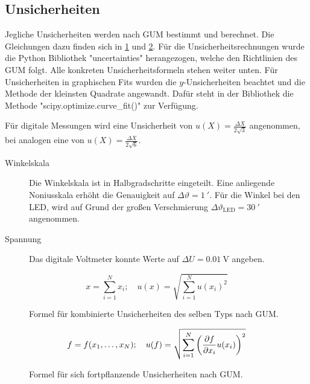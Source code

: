 \subsection{Unsicherheiten}\label{VGuD}

Jegliche Unsicherheiten werden nach GUM bestimmt und berechnet.
Die Gleichungen dazu finden sich in \ref{fig:GUM_combine} und \ref{fig:GUM_formula}.
Für die Unsicherheitsrechnungen wurde die Python Bibliothek "uncertainties" herangezogen, welche den Richtlinien des GUM folgt.
Alle konkreten Unsicherheitsformeln stehen weiter unten.
Für Unsicherheiten in graphischen Fits wurden die $y$-Unsicherheiten beachtet und die Methode der kleinsten Quadrate angewandt.
Dafür steht in der Bibliothek die Methode "scipy.optimize.curve\_fit()" zur Verfügung.

Für digitale Messungen wird eine Unsicherheit von $u(X) = \frac{\Delta X}{2\sqrt{3}}$ angenommen, bei analogen eine von $u(X) = \frac{\Delta X}{2\sqrt{6}}$.

\begin{description}
	\item[Winkelskala] Die Winkelskala ist in Halbgradschritte eingeteilt.
	Eine anliegende Noniusskala erhöht die Genauigkeit auf $\Delta \vartheta = \SI{1}{'}$. %
	Für die Winkel bei den LED, wird auf Grund der großen Verschmierung $\Delta \vartheta_\text{LED} = \SI{30}{'}$ angenommen.
	
	\item[Spannung] Das digitale Voltmeter konnte Werte auf $\Delta U = \SI{0.01}{\volt}$ angeben.
	
\end{description}
\begin{figure}[ht]
	\begin{equation*}	
		x = \sum_{i=1}^{N} x_i
		;\quad
		u(x) = \sqrt{\sum_{i = 1}^{N} u(x_i)^2}
	\end{equation*}
	\caption{Formel für kombinierte Unsicherheiten des selben Typs nach GUM.}
	\label{fig:GUM_combine}
\end{figure}

\begin{figure}[ht]
	\begin{align*}
		f = f(x_1, \dots , x_N)
		;\quad
		u(f) = \sqrt{\sum_{i = 1}^{N}\left(\pdv{f}{x_i} u(x_i)\right) ^2}
	\end{align*}
	\caption{Formel für sich fortpflanzende Unsicherheiten nach GUM.}
	\label{fig:GUM_formula}
\end{figure}

